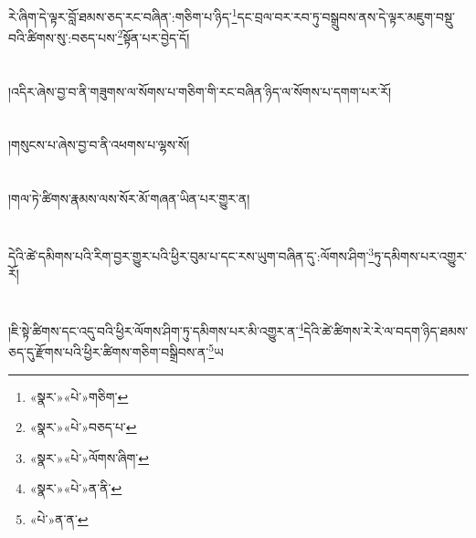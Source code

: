 རེ་ཞིག་དེ་ལྟར་བློ་ཐམས་ཅད་རང་བཞིན་:གཅིག་པ་ཉིད་\footnote{«སྣར་»«པེ་»གཅིག་}དང་བྲལ་བར་རབ་ཏུ་བསྒྲུབས་ནས་དེ་ལྟར་མཇུག་བསྡུ་བའི་ཚིགས་སུ་:བཅད་པས་\footnote{«སྣར་»«པེ་»བཅད་པ་}སྟོན་པར་བྱེད་དོ།\chapter{ }།འདིར་ཞེས་བྱ་བ་ནི་གཟུགས་ལ་སོགས་པ་གཅིག་གི་རང་བཞིན་ཉིད་ལ་སོགས་པ་དགག་པར་རོ།\chapter{ }།གསུངས་པ་ཞེས་བྱ་བ་ནི་འཕགས་པ་ལྷས་སོ།\chapter{ }།གལ་ཏེ་ཚིགས་རྣམས་ལས་སོར་མོ་གཞན་ཡིན་པར་གྱུར་ན།\chapter{ }དེའི་ཚེ་དམིགས་པའི་རིག་བྱར་གྱུར་པའི་ཕྱིར་བུམ་པ་དང་རས་ཡུག་བཞིན་དུ་:ལོགས་ཤིག་\footnote{«སྣར་»«པེ་»ལོགས་ཞིག་}ཏུ་དམིགས་པར་འགྱུར་རོ།\chapter{ }།ཇི་སྟེ་ཚིགས་དང་འདུ་བའི་ཕྱིར་ལོགས་ཤིག་ཏུ་དམིགས་པར་མི་འགྱུར་ན་\footnote{«སྣར་»«པེ་»ན་ནི་}དེའི་ཚེ་ཚིགས་རེ་རེ་ལ་བདག་ཉིད་ཐམས་ཅད་དུ་རྫོགས་པའི་ཕྱིར་ཚིགས་གཅིག་བསྒྲིབས་ན་\footnote{«པེ་»ན་ན་}ཡ